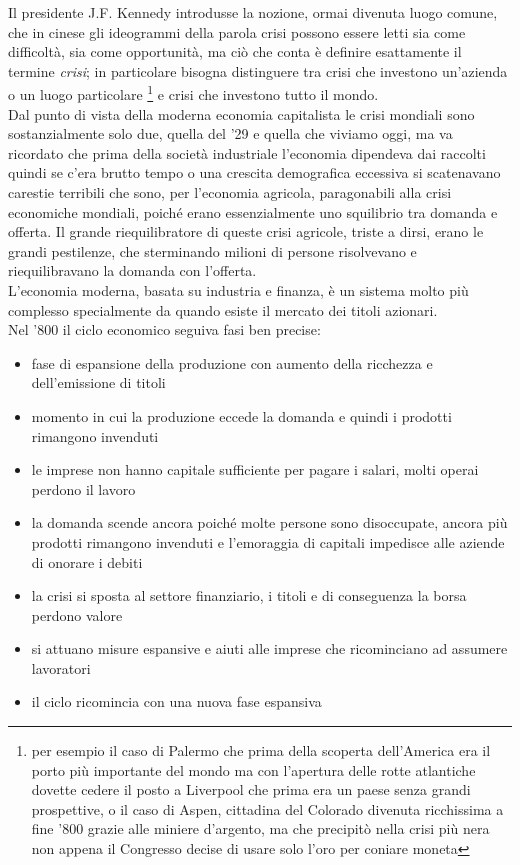 \documentclass[11pt]{article}
\begin{document}
Il presidente J.F. Kennedy introdusse la nozione, ormai divenuta luogo comune,
che in cinese gli ideogrammi della parola crisi possono essere letti
sia come difficolt\`a, sia come opportunit\`a, ma ci\`o che conta \`e 
definire esattamente il termine \emph{crisi}; in particolare bisogna distinguere
tra crisi che investono un'azienda o un luogo particolare \footnote{per esempio il caso di
Palermo che prima della scoperta dell'America era il porto pi\`u importante del mondo
ma con l'apertura delle rotte atlantiche dovette cedere il posto a 
Liverpool che prima era un paese senza grandi prospettive,
o il caso di Aspen, cittadina del Colorado divenuta ricchissima a fine '800 grazie alle miniere d'argento, 
ma che precipit\`o nella crisi pi\`u nera non appena il Congresso decise di usare 
solo l'oro per coniare moneta} e crisi che investono tutto il mondo.\\
Dal punto di vista della moderna economia capitalista le crisi mondiali sono sostanzialmente solo due,
quella del '29 e quella che viviamo oggi, ma va ricordato che
prima della societ\`a industriale l'economia dipendeva dai raccolti
quindi se c'era brutto tempo o una crescita demografica eccessiva si scatenavano
carestie terribili che sono, per l'economia agricola, paragonabili alla crisi economiche mondiali,
poich\'e erano essenzialmente uno squilibrio tra domanda e offerta. 
Il grande riequilibratore di queste crisi agricole, triste a dirsi, erano le grandi pestilenze, che sterminando 
milioni di persone risolvevano e riequilibravano la domanda con l'offerta.\\
L'economia moderna, basata su industria e finanza, \`e un sistema molto pi\`u
complesso specialmente da quando esiste il mercato dei titoli azionari.\\
Nel '800 il ciclo economico seguiva fasi ben precise:
\begin{itemize}
\item fase di espansione della produzione con aumento della ricchezza e dell'emissione di titoli
\item momento in cui la produzione eccede la domanda e quindi i prodotti rimangono invenduti
\item le imprese non hanno capitale sufficiente per pagare i salari, molti operai perdono il lavoro
\item la domanda scende ancora poich\'e molte persone sono disoccupate,
ancora pi\`u prodotti rimangono invenduti e l'emoraggia di capitali impedisce alle aziende di 
onorare i debiti
\item la crisi si sposta al settore finanziario, i titoli e di conseguenza la borsa perdono valore
\item si attuano misure espansive e aiuti alle imprese che ricominciano ad assumere lavoratori
\item il ciclo ricomincia con una nuova fase espansiva
\end{itemize}
\end{document}
